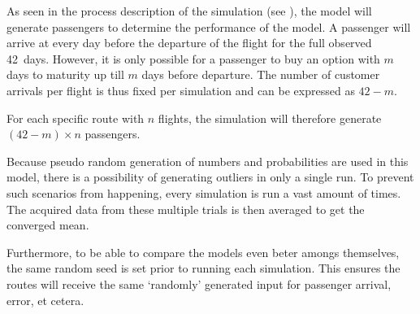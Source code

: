 As seen in the process description of the simulation (see ), the model will generate passengers to determine the performance of the model. A passenger will arrive at every day before the departure of the flight for the full observed 42~days. However, it is only possible for a passenger to buy an option with $m$ days to maturity up till $m$ days before departure. The number of customer arrivals per flight is thus fixed per simulation and can be expressed as $42 - m$.

For each specific route with $n$ flights, the simulation will therefore generate $(42 - m) \times n$ passengers.

Because pseudo random generation of numbers and probabilities are used in this model, there is a possibility of generating outliers in only a single run. To prevent such scenarios from happening, every simulation is run a vast amount of times. The acquired data from these multiple trials is then averaged to get the converged mean.

Furthermore, to be able to compare the models even beter amongs themselves, the same random seed is set prior to running each simulation. This ensures the routes will receive the same `randomly' generated input for passenger arrival, error, et cetera.